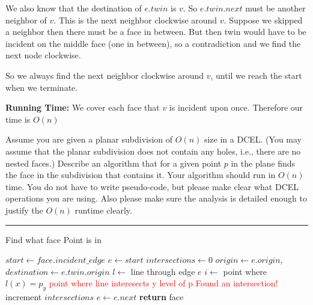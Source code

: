 \documentclass[11pt]{article}
\begin{document}
We also know that the destination of $e.twin$ is $v$. So $e.twin.next$ must be another neighbor of $v$.
This is the next neighbor clockwise around $v$. Suppose we skipped a neighbor then there must be a face in between.
But then twin would have to be incident on the middle face (one in between), so a contradiction and we find the next node clockwise.

So we always find the next neighbor clockwise around $v$, until we reach the start when we terminate.

\textbf{Running Time:} We cover each face that $v$ is incident upon once. Therefore our time is $O(n)$





Assume you are given a planar subdivision of $O(n)$ size in a DCEL. (You may
assume that the planar subdivision does not contain any holes, i.e., there are
no nested faces.) Describe an algorithm that for a given point $p$ in the plane
finds the face in the subdivision that contains it. Your algorithm should run in
$O(n)$ time. You do not have to write pseudo-code, but please make clear what
DCEL operations you are using. Also please make sure the analysis is detailed
enough to justify the $O(n)$ runtime clearly.

\hrule



\begin{algorithm}
    \caption{Find what face Point is in}
    \label{alg:point}
    \begin{algorithmic}[1]
            \State $start \gets face.incident\_edge$
            \State $e \gets start$
            \State $intersections \gets 0$
            \Do
                \State $origin \gets e.origin$, $destination \gets e.twin.origin$
                \State $l \gets$ line through edge $e$
                \State $i \gets $ point where $l(x) = p_y$ \textcolor{red}{point where line interesects y level of p}
                    \State \textcolor{red}{Found an intersection!}
                    \State increment $intersections$
                \EndIf
                \State $e \gets e.next$
                \State \textbf{return} face
            \EndIf
        \EndFor
    \EndFunction
    \end{algorithmic}
\end{algorithm}
\end{document}
